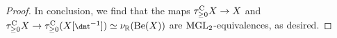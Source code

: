 \begin{proof}
  In conclusion, we find that the maps $\tau_{\geq 0} ^{\mathrm{C}} X \to X$ and $\tau_{\geq 0} ^{\cn} X \to \tau_{\geq 0} ^{\cn} (X[\ta^{-1}]) \simeq \nur(\b(X))$ are $\mathrm{MGL}_2$-equivalences, as desired.
%
%
%
%
%
%
\end{proof}

